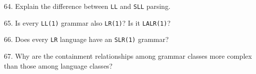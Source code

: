 \filbreak
\vskip 1cm

64. Explain the difference between {\tt LL} and {\tt SLL} parsing.

\filbreak
\vskip 1cm

65. Is every {\tt LL(1)} grammar also {\tt LR(1)}? Is it {\tt LALR(1)}?

\filbreak
\vskip 1cm

66. Does every {\tt LR} language have an {\tt SLR(1)} grammar?

\filbreak
\vskip 1cm

67. Why are the containment relationships among grammar classes more complex than those among language classes?

\filbreak
\vfill\eject
\bye
